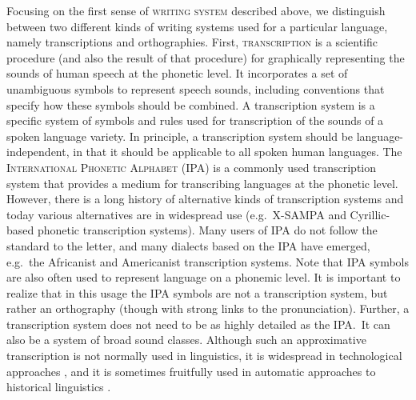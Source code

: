 Focusing on the first sense of \textsc{writing system} described above, we distinguish 
between two different kinds of writing systems used for a particular language, namely transcriptions and
orthographies. First, \textsc{transcription} is a scientific procedure (and also
the result of that procedure) for graphically representing the sounds of human
speech at the phonetic level. It incorporates a set of unambiguous symbols to
represent speech sounds, including conventions that specify how these symbols
should be combined. A transcription system is a specific system of symbols and
rules used for transcription of the sounds of a spoken language variety. In
principle, a transcription system should be language-independent, in that it
should be applicable to all spoken human languages. The \textsc{International
Phonetic Alphabet} (IPA) is a commonly used transcription system that provides a
medium for transcribing languages at the phonetic level. However, there is a
long history of alternative kinds of transcription systems
\citep[see][]{Kemp2006} and today various alternatives are in widespread use
(e.g.~X-SAMPA and Cyrillic-based phonetic transcription systems). Many
users of IPA do not follow the standard to the letter, and many dialects based
on the IPA have emerged, e.g.~the Africanist and Americanist transcription
systems. Note that IPA symbols are also often used to represent language on a
phonemic level. It is important to realize that in this usage the IPA
symbols are not a transcription system, but rather an orthography (though with
strong links to the pronunciation). Further, a transcription system does not
need to be as highly detailed as the IPA.\ It can also be a system of broad sound
classes. Although such an approximative transcription is not normally used in
linguistics, it is widespread in technological approaches
\citetext{\citealp[Soundex and variants, e.g.~][391--392]{Knuth1973};
\citealp{postel1969,Beider2008}}, and it is sometimes fruitfully used in
automatic approaches to historical linguistics
\citep{Dolgopolsky1986,List2012esslli,Brown2013}.

